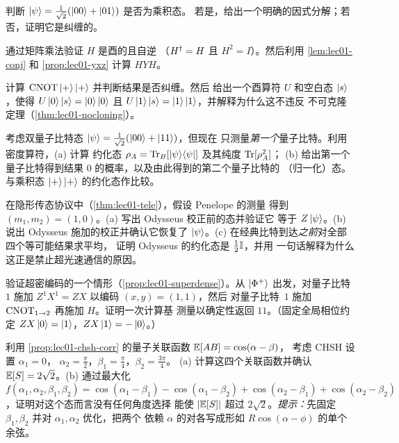 \begin{exercise}\label{ex:lec01-6}
判断 $\ket{\psi}=\tfrac{1}{\sqrt2}(\ket{00}+\ket{01})$ 是否为乘积态。
若是，给出一个明确的因式分解；若否，证明它是纠缠的。
\end{exercise}

\begin{exercise}\label{ex:lec01-7}
通过矩阵乘法验证 $H$ 是酉的且自逆
（$H^{\dagger}=H$ 且 $H^{2}=I$）。然后利用 \cref{lem:lec01-conj} 和
\cref{prop:lec01-yxz} 计算 $HYH$。
\end{exercise}

\begin{exercise}\label{ex:lec01-8}
计算 $\mathrm{CNOT}\ket{+}\ket{+}$ 并判断结果是否纠缠。然后
给出一个酉算符 $U$ 和空白态 $\ket{s}$，使得 $U\ket{0}\ket{s}=\ket{0}\ket{0}$
且 $U\ket{1}\ket{s}=\ket{1}\ket{1}$，并解释为什么这不违反
不可克隆定理（\cref{thm:lec01-nocloning}）。
\end{exercise}

\begin{exercise}\label{ex:lec01-9}
考虑双量子比特态 $\ket{\psi}=\tfrac{1}{\sqrt2}(\ket{00}+\ket{11})$，但现在
只测量\emph{第一个}量子比特。利用密度算符，(a) 计算
约化态 $\rho_A=\operatorname{Tr}_B[\ket{\psi}\!\bra{\psi}]$ 及其纯度 $\operatorname{Tr}[\rho_A^{2}]$；
(b) 给出第一个量子比特得到结果 $0$ 的概率，以及由此得到的第二个量子比特的
（归一化）态。与乘积态 $\ket{+}\ket{+}$ 的约化态作比较。
\end{exercise}

\begin{exercise}\label{ex:lec01-10}
在隐形传态协议中（\cref{thm:lec01-tele}），假设 Penelope 的测量
得到 $(m_1,m_2)=(1,0)$。(a) 写出 Odysseus 校正前的态并验证它
等于 $Z\ket{\psi}$。(b) 说出 Odysseus 施加的校正并确认它恢复了
$\ket{\psi}$。(c) 在经典比特到达\emph{之前}对全部四个等可能结果求平均，
证明 Odysseus 的约化态是 $\tfrac12\mathbb{I}$，并用
一句话解释为什么这正是禁止超光速通信的原因。
\end{exercise}

\begin{exercise}\label{ex:lec01-11}
验证超密编码的一个情形（\cref{prop:lec01-superdense}）。从
$\ket{\Phi^{+}}$ 出发，对量子比特~$1$ 施加 $Z^{1}X^{1}=Z X$ 以编码 $(x,y)=(1,1)$，然后
对量子比特~$1$ 施加 $\mathrm{CNOT}_{1\to2}$ 再施加 $H$。证明一次计算基
测量以确定性返回 $11$。（固定全局相位约定 $ZX\ket{0}
=\ket{1}$，$ZX\ket{1}=-\ket{0}$。）
\end{exercise}

\begin{exercise}\label{ex:lec01-12}
利用 \cref{prop:lec01-chsh-corr} 的量子关联函数 $\mathbb{E}[AB]=\cos(\alpha-\beta)$，
考虑 CHSH 设置 $\alpha_1=0$，
$\alpha_2=\tfrac{\pi}{2}$，$\beta_1=\tfrac{\pi}{4}$，$\beta_2=\tfrac{3\pi}{4}$。
(a) 计算这四个关联函数并确认 $\mathbb{E}[S]=2\sqrt2$。(b) 通过最大化
$f(\alpha_1,\alpha_2,\beta_1,\beta_2)=\cos(\alpha_1-\beta_1)-\cos(\alpha_1-\beta_2)
+\cos(\alpha_2-\beta_1)+\cos(\alpha_2-\beta_2)$，证明对这个态而言没有任何角度选择
能使 $\left\lvert \mathbb{E}[S] \right\rvert$ 超过 $2\sqrt2$。\emph{提示：}先固定
$\beta_1,\beta_2$ 并对 $\alpha_1,\alpha_2$ 优化，把两个
依赖 $\alpha$ 的对各写成形如 $R\cos(\alpha-\phi)$ 的单个余弦。
\end{exercise}

